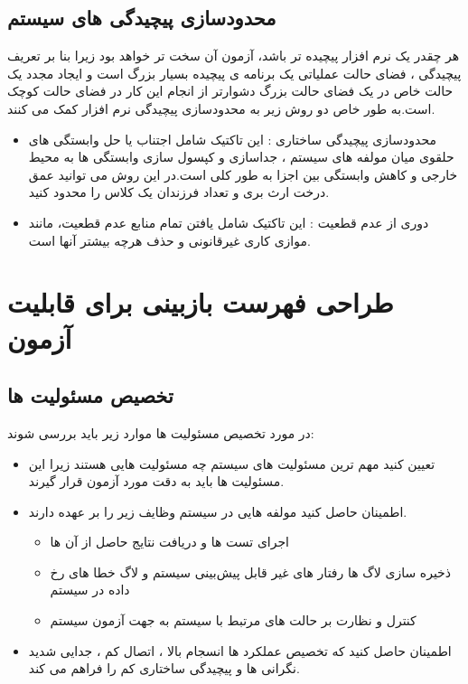 \subsection{محدودسازی پیچیدگی های سیستم}
هر چقدر یک نرم افزار پیچیده تر باشد، آزمون آن سخت تر خواهد بود زیرا بنا بر تعریف پیچیدگی ، فضای حالت عملیاتی یک برنامه ی پیچیده بسیار بزرگ است و ایجاد مجدد یک حالت خاص در یک فضای حالت بزرگ دشوارتر از انجام این کار در فضای حالت کوچک است.به طور خاص دو روش زیر به محدودسازی پیچیدگی نرم افزار کمک می کنند.
\begin{itemize}
\item
محدود‌سازی پیچیدگی ساختاری :
این تاکتیک شامل اجتناب یا حل وابستگی های حلقوی میان مولفه های سیستم ، جداسازی و کپسول سازی وابستگی ها به محیط خارجی و کاهش وابستگی بین اجزا به طور کلی است.در این روش می توانید عمق درخت ارث بری  و تعداد فرزندان یک کلاس را محدود کنید.
\item
دوری از عدم قطعیت  :
این تاکتیک شامل یافتن تمام منابع عدم قطعیت، مانند موازی کاری غیرقانونی و حذف هرچه بیشتر آنها است.
\end{itemize}
\section{طراحی فهرست بازبینی برای قابلیت آزمون}
\subsection{تخصیص مسئولیت ها} 
در مورد تخصیص مسئولیت ها موارد زیر باید بررسی شوند:
\begin{itemize}
\item
تعیین کنید مهم ترین مسئولیت های سیستم چه مسئولیت هایی هستند زیرا این مسئولیت ها باید به دقت مورد آزمون قرار گیرند.
\item
اطمینان حاصل کنید مولفه هایی در سیستم وظایف زیر را بر عهده دارند.
\begin{itemize}
\item
اجرای تست ها و دریافت نتایج حاصل از آن ها
\item
ذخیره سازی لاگ ها رفتار های غیر قابل پیش‌بینی سیستم و لاگ خطا های رخ داده در سیستم
\item
کنترل و نظارت بر حالت های مرتبط با سیستم به جهت آزمون سیستم
\end{itemize}
\item
اطمینان حاصل کنید که تخصیص عملکرد ها انسجام بالا ، اتصال کم ، جدایی شدید نگرانی ها و پیچیدگی ساختاری کم را فراهم می کند.
\end{itemize}

